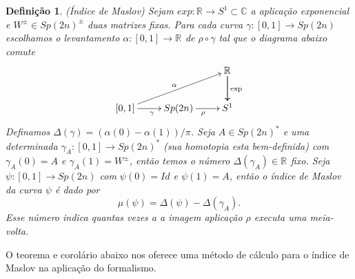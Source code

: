 \documentclass[12pt]{book}
\newtheorem{definicao}[teorema]{Definição}
\newcommand{\circulo}{S^{1}}
\newcommand{\real}[1]{\mathbb{R}^{#1}}
\begin{document}
	\begin{definicao}
		(Índice de Maslov) Sejam $exp:\real{} \to \circulo \subset \mathbb{C}$ a aplicação exponencial e $W^{\pm} \in Sp(2n)^{\pm}$ duas matrizes fixas. Para cada curva $\gamma:[0,1] \to Sp(2n)$ escolhamos o levantamento $\alpha:[0,1] \to \real{}$ de $\rho\circ \gamma$ tal que o diagrama abaixo comute
		$$
		\xymatrix{
			& & \real{}\ar[d]\ar[d]^{\text{exp}}
			\\
			[0,1 ]\ar[urr]^{\alpha} \ar[r]_{\gamma} & Sp(2n) \ar[r]_{\rho} & S^{1}
		}
		$$	
		Definamos $\varDelta(\gamma) = (\alpha(0) - \alpha(1))/\pi$. Seja $A \in Sp(2n)^{*}$ e uma determinada $\gamma_{A}:[0,1] \to Sp(2n)^{*}$ (sua homotopia esta bem-definida) com $\gamma_{A}(0) = A$ e $\gamma_{A}(1) = W^{\pm}$, então temos o número $\varDelta(\gamma_{A}) \in \real{}$ fixo.
		Seja $\psi:[0,1] \to Sp(2n)$ com $\psi(0)=Id$ e $\psi(1)=A$, então o índice de Maslov da curva $\psi$ é dado por
		$$
		\mu(\psi) = \varDelta(\psi) - \varDelta(\gamma_{A}).
		$$
		Esse número indica quantas vezes a a imagem aplicação $\rho$ executa uma meia-volta.
	\end{definicao}
	
	O teorema e corolário abaixo nos oferece uma método de cálculo para o índice de Maslov na aplicação do formalismo.
	
\end{document}
